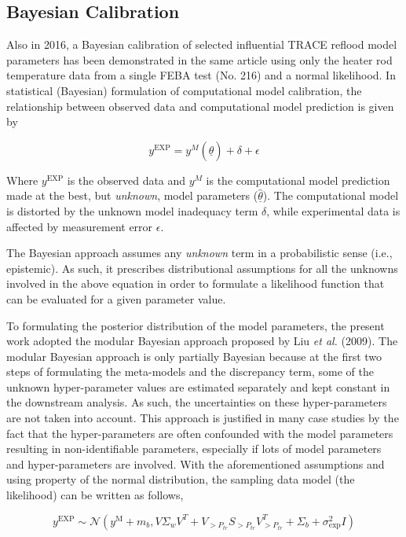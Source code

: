 \documentclass[11pt,titlepage]{article}
\begin{document}
\subsection{Bayesian Calibration}

Also in 2016, a Bayesian calibration of selected influential TRACE reflood 
model parameters has been demonstrated in the same article 
\cite{Wicaksono2016} using only the heater 
rod temperature data from a single FEBA test (No. 216) and a normal likelihood. 
In statistical (Bayesian) formulation of computational model calibration, 
the relationship between observed data and computational model prediction is 
given by

\begin{equation}
	y^{\text{EXP}} = y^M (\underline{\hat{\theta}})+ \delta + \epsilon
\end{equation}

Where $y^\text{EXP}$ is the observed data and $y^M$  is the computational model 
prediction made at the best, but \emph{unknown}, model parameters 
($\underline{\hat{\theta}}$). 
The computational model is distorted by the 
unknown model inadequacy term $\delta$, while experimental data is 
affected by measurement error $\epsilon$.

The Bayesian approach assumes any \emph{unknown} term in a probabilistic 
sense (i.e., epistemic). 
As such, it prescribes distributional assumptions for all the unknowns 
involved in the above equation in order to formulate a likelihood function 
that can be evaluated for a given parameter value.

To formulating the posterior distribution of the model parameters, 
the present work adopted the modular Bayesian approach proposed 
by Liu \textit{et al.} (2009). 
The modular Bayesian approach is only partially Bayesian because 
at the first two steps of formulating the meta-models and the discrepancy 
term, some of the unknown hyper-parameter values are estimated separately 
and kept constant in the downstream analysis. 
As such, the uncertainties on these hyper-parameters are not taken into 
account. 
This approach is justified in many case studies by the fact that the 
hyper-parameters are often confounded with the model parameters resulting 
in non-identifiable parameters, especially if lots of model parameters 
and hyper-parameters are involved. 
With the aforementioned assumptions and using property of 
the normal distribution, the sampling data model (the likelihood) can 
be written as follows,

\begin{equation}
    y^{\text{EXP}} \sim \mathcal{N}(y^\text{M} + m_b, V \Sigma_w V^T + V_{>P_{tr}} S_{>P_{tr}} V_{>P_{tr}}^T + \Sigma_b + \sigma_\text{exp}^2 I)
    \label{eq:likelihood}
\end{equation}
\end{document}
